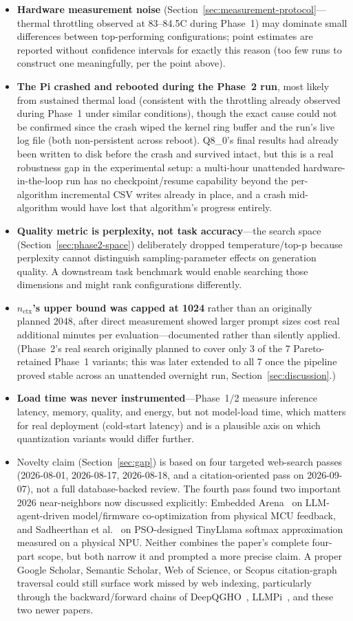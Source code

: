 \documentclass[journal]{IEEEtran}
\begin{document}
\begin{itemize}
  \item \textbf{Hardware measurement noise} (Section~\ref{sec:measurement-protocol}---thermal throttling observed at 83--84.5\textdegree C during Phase~1) may dominate small differences between top-performing configurations; point estimates are reported without confidence intervals for exactly this reason (too few runs to construct one meaningfully, per the point above).
  \item \textbf{The Pi crashed and rebooted during the Phase~2 run}, most likely from sustained thermal load (consistent with the throttling already observed during Phase~1 under similar conditions), though the exact cause could not be confirmed since the crash wiped the kernel ring buffer and the run's live log file (both non-persistent across reboot). Q8\_0's final results had already been written to disk before the crash and survived intact, but this is a real robustness gap in the experimental setup: a multi-hour unattended hardware-in-the-loop run has no checkpoint/resume capability beyond the per-algorithm incremental CSV writes already in place, and a crash mid-algorithm would have lost that algorithm's progress entirely.
  \item \textbf{Quality metric is perplexity, not task accuracy}---the search space (Section~\ref{sec:phase2-space}) deliberately dropped temperature/top-p because perplexity cannot distinguish sampling-parameter effects on generation quality. A downstream task benchmark would enable searching those dimensions and might rank configurations differently.
  \item \textbf{$n_{\text{ctx}}$'s upper bound was capped at 1024} rather than an originally planned 2048, after direct measurement showed larger prompt sizes cost real additional minutes per evaluation---documented rather than silently applied. (Phase~2's real search originally planned to cover only 3 of the 7 Pareto-retained Phase~1 variants; this was later extended to all 7 once the pipeline proved stable across an unattended overnight run, Section~\ref{sec:discussion}.)
  \item \textbf{Load time was never instrumented}---Phase~1/2 measure inference latency, memory, quality, and energy, but not model-load time, which matters for real deployment (cold-start latency) and is a plausible axis on which quantization variants would differ further.
  \item Novelty claim (Section~\ref{sec:gap}) is based on four targeted web-search passes (2026-08-01, 2026-08-17, 2026-08-18, and a citation-oriented pass on 2026-09-07), not a full database-backed review. The fourth pass found two important 2026 near-neighbors now discussed explicitly: Embedded Arena~\cite{ref21} on LLM-agent-driven model/firmware co-optimization from physical MCU feedback, and Sadheerthan et al.~\cite{ref22} on PSO-designed TinyLlama softmax approximation measured on a physical NPU. Neither combines the paper's complete four-part scope, but both narrow it and prompted a more precise claim. A proper Google Scholar, Semantic Scholar, Web of Science, or Scopus citation-graph traversal could still surface work missed by web indexing, particularly through the backward/forward chains of DeepQGHO~\cite{ref20}, LLMPi~\cite{ref19}, and these two newer papers.

\end{itemize}
\end{document}
